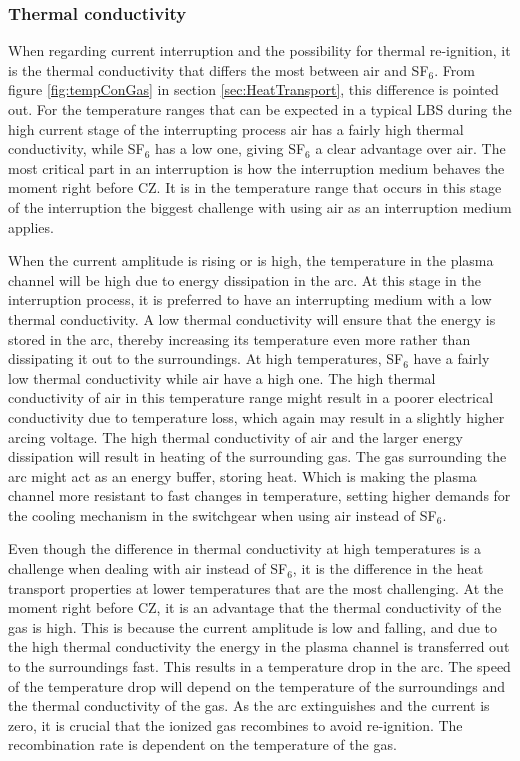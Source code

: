 \documentclass[10pt,a4paper,twoside]{article}
\begin{document}
\subsubsection*{Thermal conductivity}
When regarding current interruption and the possibility for thermal re-ignition, it is the thermal conductivity that differs the most between air and SF$_{6}$. From figure \ref{fig:tempConGas} in section \ref{sec:HeatTransport}, this difference is pointed out. For the temperature ranges that can be expected in a typical LBS during the high current stage of the interrupting process air has a fairly high thermal conductivity, while SF$_6$ has a low one, giving SF$_6$ a clear advantage over air. The most critical part in an interruption is how the interruption medium behaves the moment right before CZ. It is in the temperature range that occurs in this stage of the interruption the biggest challenge with using air as an interruption medium applies.

When the current amplitude is rising or is high, the temperature in the plasma channel will be high due to energy dissipation in the arc. At this stage in the interruption process, it is preferred to have an interrupting medium with a low thermal conductivity. A low thermal conductivity will ensure that the energy is stored in the arc, thereby increasing its temperature even more rather than dissipating it out to the surroundings. At high temperatures, SF$_6$ have a fairly low thermal conductivity while air have a high one. The high thermal conductivity of air in this temperature range might result in a poorer electrical conductivity due to temperature loss, which again may result in a slightly higher arcing voltage. The high thermal conductivity of air and the larger energy dissipation will result in heating of the surrounding gas. The gas surrounding the arc might act as an energy buffer, storing heat. Which is making the plasma channel more resistant to fast changes in temperature, setting higher demands for the cooling mechanism in the switchgear when using air instead of SF$_6$.

Even though the difference in thermal conductivity at high temperatures is a challenge when dealing with air instead of SF$_6$, it is the difference in the heat transport properties at lower temperatures that are the most challenging. At the moment right before CZ, it is an advantage that the thermal conductivity of the gas is high. This is because the current amplitude is low and falling, and due to the high thermal conductivity the energy in the plasma channel is transferred out to the surroundings fast. This results in a temperature drop in the arc. The speed of the temperature drop will depend on the temperature of the surroundings and the thermal conductivity of the gas. As the arc extinguishes and the current is zero, it is crucial that the ionized gas recombines to avoid re-ignition. The recombination rate is dependent on the temperature of the gas. 
\end{document}
